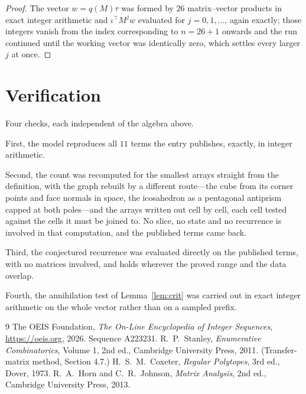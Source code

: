 \documentclass[11pt,a4paper]{article}
\theoremstyle{plain}
\theoremstyle{definition}
\begin{document}
\begin{proof}
The vector $w=q(M)\tau$ was formed by $26$ matrix--vector products in exact integer
arithmetic and $\iota^{\!\top}M^{j}w$ evaluated for $j=0,1,\dots$, again exactly; those
integers vanish from the index corresponding to $n=26+1$ onwards and the run continued
until the working vector was identically zero, which settles every larger $j$ at once.
\end{proof}

\section{Verification}

Four checks, each independent of the algebra above.

First, the model reproduces all $11$ terms the entry publishes, exactly, in integer
arithmetic.

Second, the count was recomputed for the smallest arrays straight from the definition, with the
graph rebuilt by a different route---the cube from its corner points and face normals in space,
the icosahedron as a pentagonal antiprism capped at both poles---and the arrays written out cell
by cell, each cell tested against the cells it must be joined to. No slice, no state and no
recurrence is involved in that computation, and the published terms came back.

Third, the conjectured recurrence was evaluated directly on the published terms, with no
matrices involved, and holds wherever the proved range and the data overlap.

Fourth, the annihilation test of Lemma~\ref{lem:crit} was carried out in exact integer
arithmetic on the whole vector rather than on a sampled prefix.

\begin{thebibliography}{9}
 The OEIS Foundation, \emph{The On-Line Encyclopedia of Integer
Sequences}, \url{https://oeis.org}, 2026. Sequence A223231.
 R.~P.~Stanley, \emph{Enumerative Combinatorics}, Volume 1, 2nd ed.,
Cambridge University Press, 2011. (Transfer-matrix method, Section 4.7.)
 H.~S.~M.~Coxeter, \emph{Regular Polytopes}, 3rd ed., Dover, 1973.
 R.~A.~Horn and C.~R.~Johnson, \emph{Matrix Analysis}, 2nd ed., Cambridge
University Press, 2013.
\end{thebibliography}
\end{document}
